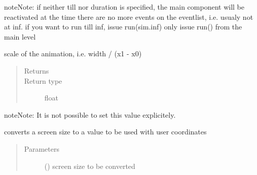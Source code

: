 \documentclass[letterpaper,10pt,english]{sphinxmanual}
\begin{document}
\begin{fulllineitems}
\begin{fulllineitems}
\begin{quote}
\begin{description}
\begin{itemize}
\end{itemize}

\end{description}\end{quote}

\begin{sphinxadmonition}{note}{Note:}
if neither till nor duration is specified, the main component will be reactivated at
the time there are no more events on the eventlist, i.e. usualy not at inf. 
if you want to run till inf, issue run(sim.inf) 
only issue run() from the main level
\end{sphinxadmonition}

\end{fulllineitems}


\begin{fulllineitems}
\label{\detokenize{Reference:salabim.Environment.scale}}
scale of the animation, i.e. width / (x1 - x0)
\begin{quote}\begin{description}
\item[{Returns}] \leavevmode
{}

\item[{Return type}] \leavevmode
float

\end{description}\end{quote}

\begin{sphinxadmonition}{note}{Note:}
It is not possible to set this value explicitely.
\end{sphinxadmonition}

\end{fulllineitems}


\begin{fulllineitems}
\label{\detokenize{Reference:salabim.Environment.screen_to_usercoordinates_size}}
converts a screen size to a value to be used with user coordinates
\begin{quote}\begin{description}
\item[{Parameters}] \leavevmode
{} () \textendash{} screen size to be converted


\end{description}
\end{quote}
\end{fulllineitems}
\end{fulllineitems}
\end{document}
